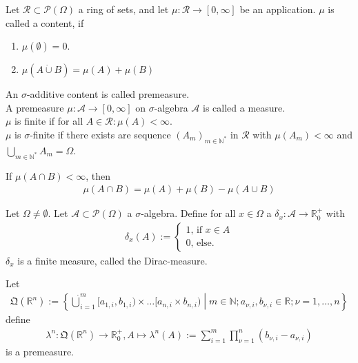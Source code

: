 \begin{definition}
    Let \(\mathcal{R} \subset \mathcal{P}(\Omega)\) a ring of sets, and let \(\mu: \mathcal{R} \rightarrow [0, \infty]\) be an application. \(\mu\) is called a content, if
    \begin{enumerate}
        \item \(\mu(\emptyset) = 0\).
        \item \(\mu(A \dot\cup B) = \mu(A) + \mu(B)\)
    \end{enumerate}
    An \(\sigma\)-additive content is called premeasure.\\
    A premeasure \(\mu: \mathcal{A} \rightarrow [0, \infty]\) on \(\sigma\)-algebra \(\mathcal{A}\) is called a measure.\\
    \(\mu\) is finite if for all \(A \in \mathcal{R}: \mu(A) < \infty\).\\
    \(\mu\) is \(\sigma\)-finite if there exists are sequence \((A_m)_{m \in \mathbb{N}^*}\) in \(\mathcal{R}\) with \(\mu(A_m) < \infty\) and \(\bigcup_{m \in \mathbb{N}^*}A_m = \Omega\).
\end{definition}
\begin{lemma}
    If \(\mu(A \cap B) < \infty\), then
    \begin{align}
        \mu(A \cap B) = \mu(A) + \mu(B) - \mu(A \cup B)
    \end{align}
\end{lemma}
\begin{theorem}
\end{theorem}
\begin{example}
    Let \(\Omega \neq \emptyset\). Let \(\mathcal{A} \subset \mathcal{P}(\Omega)\) a \(\sigma\)-algebra. Define for all \(x \in \Omega\) a \(\delta_x: \mathcal{A} \rightarrow \mathbb{R}_0^+\) with
    \begin{align}
        \delta_x (A) := 
        \begin{cases}
            1 \text{, if \(x \in A\)} \\
            0 \text{, else.}
        \end{cases}
    \end{align}
    \(\delta_x\) is a finite measure, called the Dirac-measure.
\end{example}
\begin{definition}
    Let
    \begin{align}
    \mathfrak{Q}(\mathbb{R}^n) := \left\{ \dot\bigcup_{i=1}^m [a_{1, i}, b_{1, i}) \times \dots [a_{n, i} \times b_{n, i}) \middle| m \in \mathbb{N}; a_{\nu, i}, b_{\nu, i} \in \mathbb{R}; \nu = 1, \dots, n \right\}
    \end{align}
    define
    \begin{align}
        \lambda^n : \mathfrak{Q}(\mathbb{R}^n) \rightarrow \mathbb{R}_0^+, A \mapsto \lambda^n (A) := \sum_{i=1}^m \prod_{\nu = 1}^n (b_{\nu, i} - a_{\nu, i})
    \end{align}
    is a premeasure.
\end{definition}
